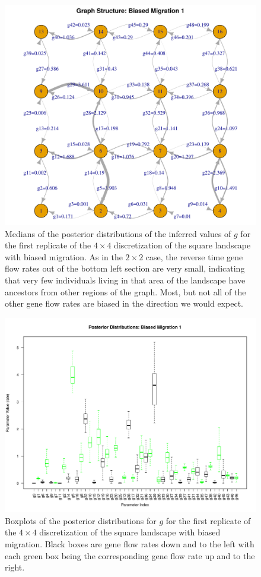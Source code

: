 \documentclass{article}
\begin{document}
\begin{figure}
\centering
 \includegraphics[scale=.8]{figs/grid_bias_4x4_1}
\caption{Medians of the posterior distributions of the inferred values of $g$ 
for the first replicate of the $4 \times 4$ discretization of the square landscape with biased migration.
As in the $2 \times 2$ case, 
the reverse time gene flow rates out of the bottom left section are very small,
indicating that very few individuals living in that area of the landscape
have ancestors from other regions of the graph.
Most, but not all of the other gene flow rates are biased 
in the direction we would expect.}
\label{fig:grid_bias_4x4_1}
\end{figure}

\begin{figure}
\centering
 \includegraphics[scale=.6]{figs/post_dists_bias_4x4_1}
\caption{Boxplots of the posterior distributions for $g$ 
for the first replicate of the $4 \times 4$ discretization of the square landscape with biased migration.
Black boxes are gene flow rates down and to the left 
with each green box being the corresponding gene flow rate up and to the right.}
\label{fig:post_dists_bias_4x4_1}
\end{figure}
\end{document}
